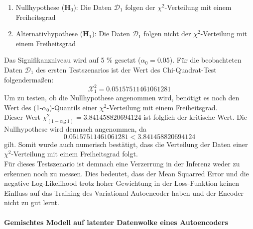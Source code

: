 \documentclass[%
thesis=student,%
coverpage=false,%
titlepage=false,%
headmarks=true, %
german,%
font=libertine, %
math=newpxtx, %
BCOR=5mm,%
coverBCOR=11mm%
]{tumbook}
\theoremstyle{break}
\begin{document}
\begin{enumerate}
	\item Nullhypothese ($\mathbf{H}_0$): Die Daten $\mathcal{D}_1$ folgen der $\chi^2$-Verteilung mit einem Freiheitsgrad\\
	\item Alternativhypothese ($\mathbf{H}_1$): Die Daten $\mathcal{D}_1$ folgen nicht der $\chi^2$-Verteilung mit einem Freiheitsgrad \\
\end{enumerate}
Das Signifikanzniveau wird auf 5 \% gesetzt ($\alpha_0 = 0.05$).
Für die beobachteten Daten $\mathcal{D}_1$ des ersten Testszenarios ist der Wert des Chi-Quadrat-Test folgendermaßen:\\
$$\mathcal{X}^2_1 = 0.05157511461061281$$
Um zu testen, ob die Nullhypothese angenommen wird, benötigt es noch den Wert des (1-$\alpha_0$)-Quantils einer $\chi^2$-Verteilung mit einem Freiheitsgrad.\\
Dieser Wert $\chi^2_{(1-\alpha_0; 1)} = 3.841458820694124$ ist folglich der kritische Wert.
Die Nullhypothese wird demnach angenommen, da $$0.05157511461061281 < 3.841458820694124$$ gilt. Somit wurde auch numerisch bestätigt, dass die Verteilung der Daten einer $\chi^2$-Verteilung mit einem Freiheitsgrad folgt. 
\\
Für dieses Testszenario ist demnach eine Verzerrung in der Inferenz weder zu erkennen noch zu messen. Dies bedeutet, dass der Mean Squarred Error und die negative Log-Likelihood trotz hoher Gewichtung in der Loss-Funktion keinen Einfluss auf das Training des Variational Autoencoder haben und der Encoder nicht zu gut lernt.\\
\\
\textbf{Gemischtes Modell auf latenter Datenwolke eines Autoencoders}\\
\end{document}
